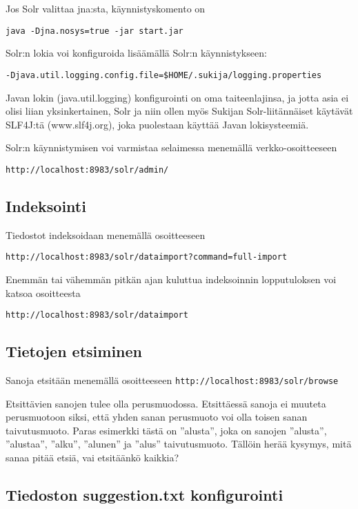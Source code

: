 \documentclass[12pt,a4paper]{scrartcl}
\begin{document}
Jos Solr valittaa jna:sta, käynnistyskomento on

\verb|java -Djna.nosys=true -jar start.jar|

Solr:n lokia voi konfiguroida lisäämällä Solr:n käynnistykseen:

\verb|-Djava.util.logging.config.file=$HOME/.sukija/logging.properties|


Javan lokin (java.util.logging) konfigurointi on oma taiteenlajinsa,
ja jotta asia ei olisi liian yksinkertainen, Solr ja niin ollen myös
Sukijan Solr-liitännäiset käytävät SLF4J:tä (www.slf4j.org), joka
puolestaan käyttää Javan lokisysteemiä.

Solr:n käynnistymisen voi varmistaa selaimessa menemällä verkko-osoitteeseen

\verb|http://localhost:8983/solr/admin/|


\subsection*{Indeksointi}

Tiedostot indeksoidaan menemällä osoitteeseen

\verb|http://localhost:8983/solr/dataimport?command=full-import|

Enemmän tai vähemmän pitkän ajan kuluttua indeksoinnin lopputuloksen
voi katsoa osoitteesta

\verb|http://localhost:8983/solr/dataimport|


\subsection*{Tietojen etsiminen}

Sanoja etsitään menemällä osoitteeseen
\verb=http://localhost:8983/solr/browse=

Etsittävien sanojen tulee olla perusmuodossa. Etsittäessä sanoja ei
muuteta perusmuotoon siksi, että yhden sanan perusmuoto voi olla
toisen sanan taivutusmuoto. Paras esimerkki tästä on ''alusta'', joka
on sanojen ''alusta'', ''alustaa'', ''alku'', ''alunen'' ja ''alus''
taivutusmuoto. Tällöin herää kysymys, mitä sanaa pitää etsiä, vai
etsitäänkö kaikkia?




\subsection*{Tiedoston suggestion.txt konfigurointi}
\end{document}
